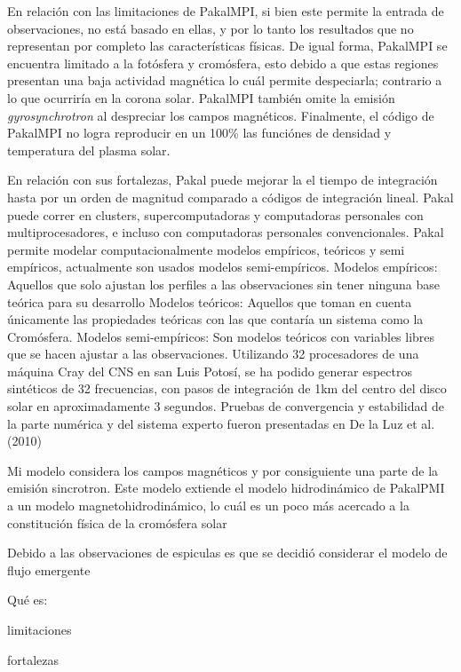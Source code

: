 \documentclass[9pt]{book}
\begin{document}
En relaci\'on con las limitaciones de PakalMPI, si bien este permite la entrada de observaciones, no est\'a basado en ellas, y por lo tanto los resultados que no representan por completo las caracter\'isticas f\'isicas. De igual forma, PakalMPI se encuentra limitado a la fot\'osfera y crom\'osfera, esto debido a que estas regiones presentan una baja actividad magn\'etica lo cu\'al permite despeciarla; contrario a lo que ocurrir\'ia en la corona solar. PakalMPI tambi\'en omite la emisi\'on \emph{gyrosynchrotron} al despreciar los campos magn\'eticos. Finalmente, el c\'odigo de PakalMPI no logra reproducir en un 100\% las funci\'ones de densidad y temperatura del plasma solar.
 

En relaci\'on con sus fortalezas, 
Pakal puede mejorar la el tiempo de integraci\'on hasta por un orden de magnitud comparado a c\'odigos de integraci\'on lineal.
Pakal puede correr en clusters, supercomputadoras y computadoras personales con multiprocesadores, e incluso con computadoras personales convencionales.
Pakal permite modelar computacionalmente modelos emp\'iricos, te\'oricos y semi emp\'iricos, actualmente son usados modelos semi-emp\'iricos.
Modelos emp\'iricos: Aquellos que solo ajustan los perfiles a las observaciones sin tener ninguna base te\'orica para su desarrollo
Modelos te\'oricos: Aquellos que toman en cuenta \'unicamente las propiedades te\'oricas con las que contar\'ia un sistema como la Crom\'osfera.
Modelos semi-emp\'iricos: Son modelos te\'oricos con variables libres que se hacen ajustar a las observaciones.
Utilizando 32 procesadores de una m\'aquina Cray del CNS en san Luis Potos\'i, se ha podido generar espectros sint\'eticos de 32 frecuencias, con pasos de integraci\'on de 1km del centro del disco solar en aproximadamente 3 segundos.
Pruebas de convergencia y estabilidad de la parte num\'erica y del sistema experto fueron presentadas en De la Luz et al. (2010)

Mi modelo considera los campos magn\'eticos y por consiguiente una parte de la emisi\'on sincrotron. Este modelo extiende el modelo hidrodin\'amico de PakalPMI a un modelo magnetohidrodin\'amico, lo cu\'al es un poco m\'as acercado a la constituci\'on f\'isica de la crom\'osfera solar

Debido a las observaciones de espiculas es que se decidi\'o considerar el modelo de flujo emergente

Qu\'e es:


limitaciones



fortalezas
 
\end{document}
